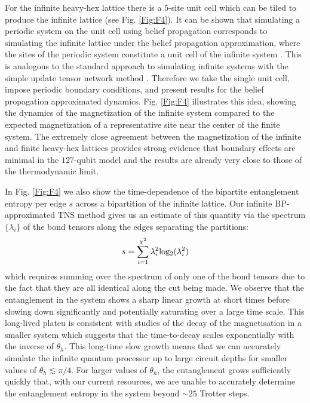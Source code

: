 \documentclass[%
 superscriptaddress,
 amsmath,amssymb,
 prx, nofootinbib,
]{revtex4-2}
\begin{document}
For the infinite heavy-hex lattice there is a $5$-site unit cell which can be tiled to produce the infinite lattice (see Fig. \ref{Fig:F4}). 
It can be shown that simulating a periodic system on the unit cell using belief propagation corresponds to simulating the infinite lattice under the belief propagation approximation, where the sites of the periodic system constitute a unit cell of the infinite system \cite{TindallGauging2023}.
This is analogous to the standard approach to simulating infinite systems with the simple update tensor network method \cite{Jiang2008}. 
Therefore we take the single unit cell, impose periodic boundary conditions, and present results for the belief propagation approximated dynamics.
Fig. \ref{Fig:F4} illustrates this idea, showing the dynamics of the magnetization of the infinite system compared to the expected magnetization of a representative site near the center of the finite system. The extremely close agreement between the magnetization of the infinite and finite heavy-hex lattices provides strong evidence that boundary effects are minimal in the $127$-qubit model and the results are already very close to those of the thermodynamic limit. 

In Fig. \ref{Fig:F4} we also show the time-dependence of the bipartite entanglement entropy per edge $s$ across a bipartition of the infinite lattice. Our infinite BP-approximated TNS method gives us an estimate of this quantity via the spectrum $\{\lambda_{i}\}$ of the bond tensors along the edges separating the partitions:
\begin{equation}
    s = \sum_{i=1}^{\chi^{2}}\lambda_{i}^{2}{\rm log_{2}}(\lambda_{i}^{2})
    \label{Eq:EntanglementEntropy}
\end{equation}
which requires summing over the spectrum of only one of the bond tensors due to the fact that they are all identical along the cut being made. We observe that the entanglement in the system shows a sharp linear growth at short times before slowing down significantly and potentially saturating over a large time scale. This long-lived plateu is consistent with studies of the decay of the magnetisation in a smaller system \cite{kechedzhi2023} which suggests that the time-to-decay scales exponentially with the inverse of $\theta_{h}$.
This long-time slow growth means that we can accurately simulate the infinite quantum processor up to large circuit depths for smaller values of $\theta_{h} \lesssim \pi/4$. For larger values of $\theta_{h}$, the entanglement grows sufficiently quickly that, with our current resources, we are unable to accurately determine the entanglement entropy in the system beyond $\sim 25$ Trotter steps.
\end{document}
